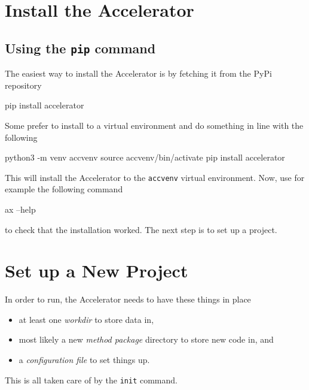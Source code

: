 
\section{Install the Accelerator}

\subsection{Using the \texttt{pip} command}
The easiest way to install the Accelerator is by fetching it from the
PyPi repository
\begin{shell}
pip install accelerator
\end{shell}
Some prefer to install to a virtual environment and do something in
line with the following
\begin{shell}
python3 -m venv accvenv
source accvenv/bin/activate
pip install accelerator
\end{shell}
This will install the Accelerator to the \texttt{accvenv} virtual
environment.  Now, use for example the following command
\begin{shell}
ax --help
\end{shell}
to check that the installation worked.  The next step is to set up a
project.



\section{Set up a New Project}
In order to run, the Accelerator needs to have these things in place
\begin{itemize}
\item[] at least one \textsl{workdir} to store data in,
\item[] most likely a new \textsl{method package} directory to store new code in, and
\item[] a \textsl{configuration file} to set things up.
\end{itemize}
This is all taken care of by the \texttt{init} command.




